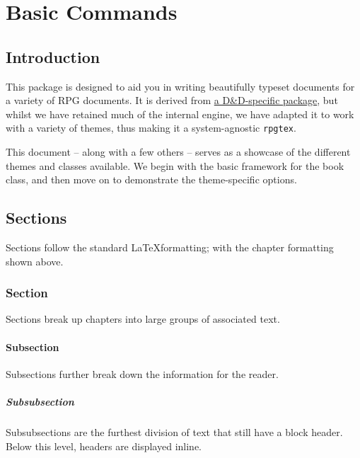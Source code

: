 
\frontmatter
\maketitle
\tableofcontents


\mainmatter

\part{Basic Commands}

	\chapter{Introduction}


	 This package is designed to aid you in writing beautifully typeset documents for a variety of RPG documents. It is derived from \href{https://github.com/rpgtex/DND-5e-LaTeX-Template}{a D\&D-specific package}, but whilst we have retained much of the internal engine, we have adapted it to work with a variety of themes, thus making it a system-agnostic \verb|rpgtex|.

	This document -- along with a few others -- serves as a showcase of the different themes and classes available. We begin with the basic framework for the book class, and then move on to demonstrate the theme-specific options.

	\chapter{Sections}
		Sections follow the standard \LaTeX formatting; with the chapter formatting shown above.
		\section{Section}
			Sections break up chapters into large groups of associated text.

			\subsection{Subsection}
				Subsections further break down the information for the reader.

				\subsubsection{Subsubsection}
					Subsubsections are the furthest division of text that still have a block header. Below this level, headers are displayed inline.

